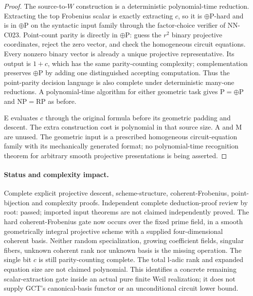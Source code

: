 \begin{proof}
The source-to-$W$ construction is a deterministic polynomial-time reduction. Extracting the top Frobenius scalar is exactly extracting $c$, so it is $\oplus\mathrm P$-hard and is in $\oplus\mathrm P$ on the syntactic input family through the factor-choice verifier of NN-C023. Point-count parity is directly in $\oplus\mathrm P$: guess the $r^2$ binary projective coordinates, reject the zero vector, and check the homogeneous circuit equations. Every nonzero binary vector is already a unique projective representative. Its output is $1+c$, which has the same parity-counting complexity; complementation preserves $\oplus\mathrm P$ by adding one distinguished accepting computation. Thus the point-parity decision language is also complete under deterministic many-one reductions. A polynomial-time algorithm for either geometric task gives $\mathrm P=\oplus\mathrm P$ and $\mathrm{NP}=\mathrm{RP}$ as before.

E evaluates $c$ through the original formula before its geometric padding and descent. The extra construction cost is polynomial in that source size. A and M are unused. The geometric input is a prescribed homogeneous circuit-equation family with its mechanically generated format; no polynomial-time recognition theorem for arbitrary smooth projective presentations is being asserted.
\end{proof}
\paragraph{Status and complexity impact.}
Complete explicit projective descent, scheme-structure, coherent-Frobenius, point-bijection and complexity proofs. Independent complete deduction-proof review by root: passed; imported input theorems are not claimed independently proved. The hard coherent-Frobenius gate now occurs over the fixed prime field, in a smooth geometrically integral projective scheme with a supplied four-dimensional coherent basis. Neither random specialization, growing coefficient fields, singular fibers, unknown coherent rank nor unknown basis is the missing operation. The single bit $c$ is still parity-counting complete. The total l-adic rank and expanded equation size are not claimed polynomial. This identifies a concrete remaining scalar-extraction gate inside an actual pure finite Weil realization; it does not supply GCT's canonical-basis functor or an unconditional circuit lower bound.

